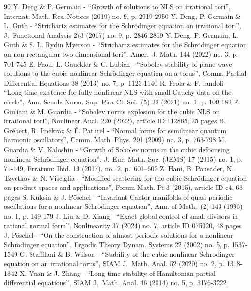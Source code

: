 \documentclass[10pt,a4paper]{amsart}
\theoremstyle{plain}
\theoremstyle{definition}
\newcommand{\1}{\mathbf{1}}
\begin{document}
\begin{thebibliography}{99}
 Y. Deng \& P. Germain - “Growth of solutions to NLS on irrational tori”, Internat. Math. Res. Notices (2019) no. 9, p. 2919-2950
 Y. Deng, P. Germain \& L. Guth - “Strichartz estimates for the Schrödinger equation on irrational tori”, J. Functional Analysis 273 (2017) no. 9, p. 2846-2869
 Y. Deng, P. Germain, L. Guth \& S. L. Rydin Myerson - “Strichartz estimates for the Schrödinger equation on non-rectangular two-dimensional tori”, Amer. J. Math. 144 (2022) no. 3, p. 701-745
 E. Faou, L. Gauckler \& C. Lubich - “Sobolev stability of plane wave solutions to the cubic nonlinear Schrödinger equation on a torus”, Comm. Partial Differential Equations 38 (2013) no. 7, p. 1123-1140
 R. Feola \& F. Iandoli - “Long time existence for fully nonlinear NLS with small Cauchy data on the circle”, Ann. Scuola Norm. Sup. Pisa Cl. Sci. (5) 22 (2021) no. 1, p. 109-182
 F. Giuliani \& M. Guardia - “Sobolev norms explosion for the cubic NLS on irrational tori”, Nonlinear Anal. 220 (2022), article ID 112865, 25 pages
 B. Grébert, R. Imekraz \& É. Paturel - “Normal forms for semilinear quantum harmonic oscillators”, Comm. Math. Phys. 291 (2009) no. 3, p. 763-798
 M. Guardia \& V. Kaloshin - “Growth of Sobolev norms in the cubic defocusing nonlinear Schrödinger equation”, J. Eur. Math. Soc. (JEMS) 17 (2015) no. 1, p. 71-149, Erratum: Ibid. 19 (2017), no. 2, p. 601–602
 Z. Hani, B. Pausader, N. Tzvetkov \& N. Visciglia - “Modified scattering for the cubic Schrödinger equation on product spaces and applications”, Forum Math. Pi 3 (2015), article ID e4, 63 pages
 S. Kuksin \& J. Pöschel - “Invariant Cantor manifolds of quasi-periodic oscillations for a nonlinear Schrödinger equation”, Ann. of Math. (2) 143 (1996) no. 1, p. 149-179
 J. Liu \& D. Xiang - “Exact global control of small divisors in rational normal form”, Nonlinearity 37 (2024) no. 7, article ID 075020, 48 pages
 J. Pöschel - “On the construction of almost periodic solutions for a nonlinear Schrödinger equation”, Ergodic Theory Dynam. Systems 22 (2002) no. 5, p. 1537-1549
 G. Staffilani \& B. Wilson - “Stability of the cubic nonlinear Schrodinger equation on an irrational torus”, SIAM J. Math. Anal. 52 (2020) no. 2, p. 1318-1342
 X. Yuan \& J. Zhang - “Long time stability of Hamiltonian partial differential equations”, SIAM J. Math. Anal. 46 (2014) no. 5, p. 3176-3222
\end{thebibliography}
\end{document}
